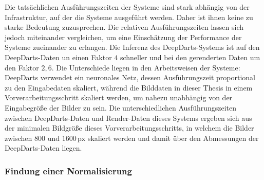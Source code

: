 Die tatsächlichen Ausführungszeiten der Systeme sind stark abhängig von der Infrastruktur, auf der die Systeme ausgeführt werden. Daher ist ihnen keine zu starke Bedeutung zuzusprechen. Die relativen Ausführungszeiten lassen sich jedoch miteinander vergleichen, um eine Einschätzung der Performance der Systeme zueinander zu erlangen. Die Inferenz des DeepDarts-Systems ist auf den DeepDarts-Daten un einen Faktor $4$ schneller und bei den gerenderten Daten um den Faktor $2,6$. Die Unterschiede liegen in den Arbeitsweisen der Systeme: DeepDarts verwendet ein neuronales Netz, dessen Ausführungszeit proportional zu den Eingabedaten skaliert, während die Bilddaten in dieser Thesis in einem Vorverarbeitungsschritt skaliert werden, um nahezu unabhängig von der Eingabegröße der Bilder zu sein. Die unterschiedlichen Ausführungszeiten zwischen DeepDarts-Daten und Render-Daten dieses Systems ergeben sich aus der minimalen Bildgröße dieses Vorverarbeitungsschritts, in welchem die Bilder zwischen $800$ und $1600\,\text{px}$ skaliert werden und damit über den Abmessungen der DeepDarts-Daten liegen.

\subsubsection{Findung einer Normalisierung} %


